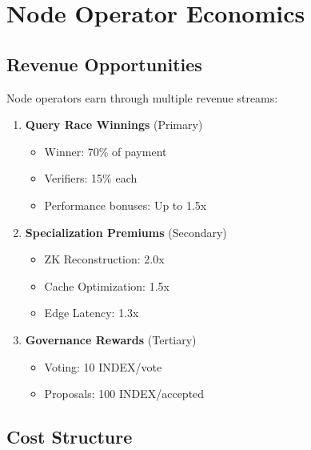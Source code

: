 \documentclass[12pt,a4paper]{article}
\begin{document}
\section{Node Operator Economics}

\subsection{Revenue Opportunities}

Node operators earn through multiple revenue streams:

\begin{enumerate}
    \item \textbf{Query Race Winnings} (Primary)
    \begin{itemize}
        \item Winner: 70\% of payment
        \item Verifiers: 15\% each
        \item Performance bonuses: Up to 1.5x
    \end{itemize}

    \item \textbf{Specialization Premiums} (Secondary)
    \begin{itemize}
        \item ZK Reconstruction: 2.0x
        \item Cache Optimization: 1.5x
        \item Edge Latency: 1.3x
    \end{itemize}

    \item \textbf{Governance Rewards} (Tertiary)
    \begin{itemize}
        \item Voting: 10 INDEX/vote
        \item Proposals: 100 INDEX/accepted
    \end{itemize}
\end{enumerate}

\subsection{Cost Structure}
\end{document}
